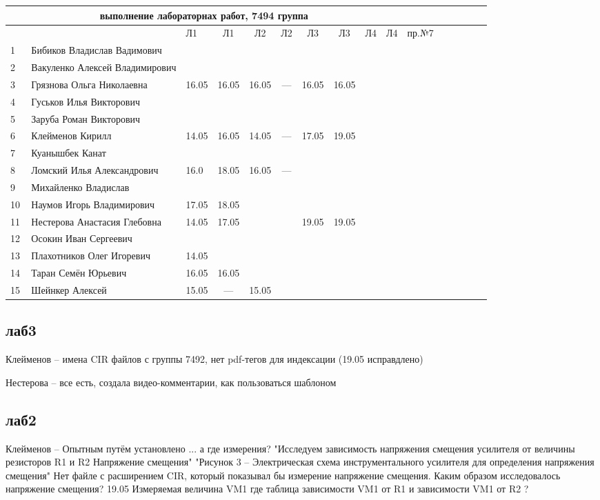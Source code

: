 \documentclass[a4paper,11pt]{article}
\begin{document}
\newpage
%
\begin{tabular}{l|llccccccccccccc}
\multicolumn{10}{c}{выполнение лабораторнах работ, 7494 группа} \\
\toprule
&&Л1&Л1& Л2&Л2& Л3&Л3& Л4&Л4&пр.№7\\ 
\midrule
1\,&Бибиков Владислав Вадимович    &&&&&&&&\\
2\,&Вакуленко Алексей Владимирович &&&&&&&&\\
3\,&Грязнова Ольга Николаевна      &16.05&16.05&16.05& --- &16.05&16.05&&\\
4\,&Гуськов Илья Викторович        &&&&&&&&\\
5\,&Заруба Роман Викторович        &&&&&&&&\\
\midrule
6\,&Клейменов Кирилл               &14.05&16.05&14.05& --- &17.05&19.05&&\\
7\,&Куанышбек Канат                &&&&&&&&\\
8\,&Ломский Илья Александрович     &16.0&18.05&16.05& --- &&&&\\
9\,&Михайленко Владислав           &&&&&&&&\\
10\,&Наумов Игорь Владимирович     &17.05&18.05&&&&&&\\
\midrule
11\,&Нестерова Анастасия Глебовна  &14.05&17.05& & &19.05&19.05&&\\
12\,&Осокин Иван Сергеевич         &&&&&&&&\\
13\,&Плахотников Олег Игоревич     &14.05&&&&&&&\\
14\,&Таран Семён Юрьевич           &16.05&16.05&&&&&&\\
15\,&Шейнкер Алексей               &15.05& --- &15.05&&&&&\\

\bottomrule
\end{tabular}

\newpage
\subsection*{лаб3}

Клейменов -- имена CIR файлов с группы 7492, нет pdf-тегов для индексации (19.05 исправдлено)

Нестерова -- все есть, создала видео-комментарии, как пользоваться шаблоном

\newpage
\subsection*{лаб2}
Клейменов -- Опытным путём установлено ... а где измерения? 
 "Исследуем зависимость напряжения смещения усилителя от величины резисторов R1 и R2 Напряжение смещения"
"Рисунок 3 – Электрическая схема инструментального усилителя для определения напряжения смещения"
Нет файле с расширением CIR, который показывал бы измерение напряжение смещения.
Каким образом исследовалось напряжение смещения?
19.05 Измеряемая величина VM1 где таблица зависимости VM1 от R1 и зависимости VM1 от R2 ?
\end{document}
